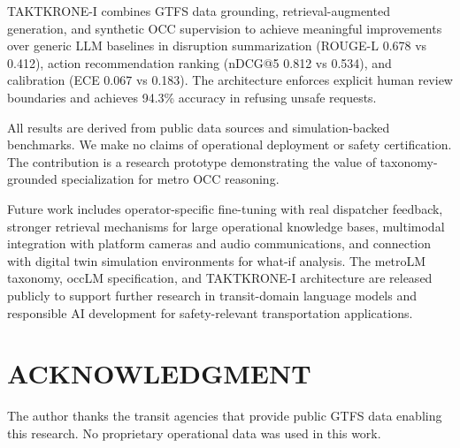 \documentclass{IEEEoj}
\begin{document}
TAKTKRONE-I combines GTFS data grounding, retrieval-augmented generation, and synthetic OCC supervision to achieve meaningful improvements over generic LLM baselines in disruption summarization (ROUGE-L 0.678 vs 0.412), action recommendation ranking (nDCG@5 0.812 vs 0.534), and calibration (ECE 0.067 vs 0.183). The architecture enforces explicit human review boundaries and achieves 94.3\% accuracy in refusing unsafe requests.

All results are derived from public data sources and simulation-backed benchmarks. We make no claims of operational deployment or safety certification. The contribution is a research prototype demonstrating the value of taxonomy-grounded specialization for metro OCC reasoning.

Future work includes operator-specific fine-tuning with real dispatcher feedback, stronger retrieval mechanisms for large operational knowledge bases, multimodal integration with platform cameras and audio communications, and connection with digital twin simulation environments for what-if analysis. The metroLM taxonomy, occLM specification, and TAKTKRONE-I architecture are released publicly to support further research in transit-domain language models and responsible AI development for safety-relevant transportation applications.

\section*{ACKNOWLEDGMENT}

The author thanks the transit agencies that provide public GTFS data enabling this research. No proprietary operational data was used in this work.




\end{document}
